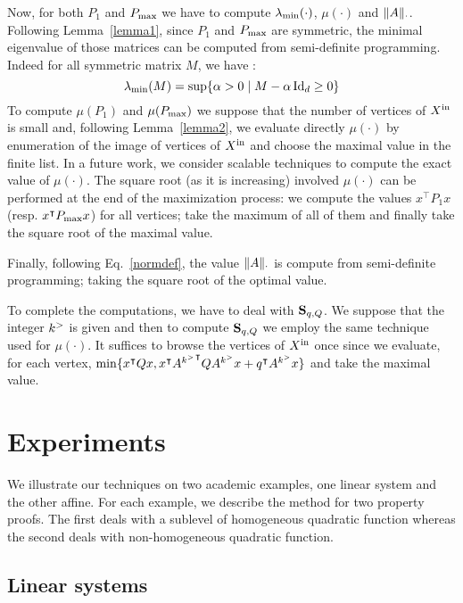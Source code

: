 \documentclass[10pt]{llncs}
\begin{document}
Now, for both $P_1$ and $P_{\mathrm{max}}$ we have to compute $\lambda_{\operatorname{min}}(\cdot)$, $\mu(\cdot)$ and $\| A\|_{\cdot}$. Following Lemma~\ref{lemma1}, since $P_1$ and $P_{\mathrm{max}}$ are symmetric, the minimal eigenvalue
of those matrices can be computed from semi-definite programming. Indeed for all symmetric matrix $M$, we have : 
\[
\lambda_{\operatorname{min}}(M)=\sup\{\alpha>0\mid M-\alpha \operatorname{Id}_d\geq 0\}
\] 
To compute $\mu(P_1)$ and $\mu(P_{\mathrm{max}})$ we suppose that the number of vertices of $X^\mathrm{in}$ is small and, following Lemma~\ref{lemma2}, we evaluate directly $\mu(\cdot)$ by enumeration of the image of vertices of $X^\mathrm{in}$ and choose the maximal value in the finite list. In a future work, we consider scalable techniques to compute the exact value of $\mu(\cdot)$. The square root (as it is increasing) involved $\mu(\cdot)$ can be performed at the end of the maximization process: we compute the values $x^\intercal P_1 x$ (resp. $x^\intercal P_{\mathrm{max}} x$) for all vertices; take the maximum of all of them and finally take the square root of the maximal value. 

Finally, following Eq.~\eqref{normdef}, the value $\| A\|_\cdot$ is compute from semi-definite programming; taking the square root of the optimal value.

To complete the computations, we have to deal with $\mathbf{S}_{q,Q}$. We suppose that the integer $k^{>}$ is given and then to compute $\mathbf{S}_{q,Q}$ we employ the same technique used for $\mu(\cdot)$. It suffices to browse the vertices of $X^\mathrm{in}$ once since we evaluate, for each vertex, $\min\{x^\intercal Q x, x^\intercal {A^{k^{>}}}^\intercal Q {A^{k^{>}}}x+q^\intercal A^{k^{>}} x\}$ and take the maximal value. 
\section{Experiments}
\label{experiments}
We illustrate our techniques on two academic examples, one linear system and the other affine.
For each example, we describe the method for two property proofs. The first deals with a sublevel of homogeneous quadratic function whereas the second deals with non-homogeneous quadratic function. 
\subsection{Linear systems}
\end{document}
